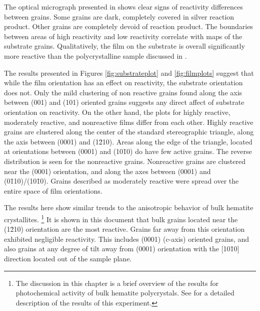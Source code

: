 The optical micrograph presented in  shows clear signs of reactivity differences between grains. Some grains are dark, completely covered in silver reaction product. Other grains are completely devoid of reaction product. The boundaries between areas of high reactivity and low reactivity correlate with  maps of the substrate grains. Qualitatively, the  film on the  substrate is overall significantly more reactive than the polycrystalline sample discussed in . 

The results presented in Figures \ref{fig:substrateplot} and \ref{fig:filmplots} suggest that while the film orientation has an effect on reactivity, the substrate orientation does not. Only the mild clustering of non reactive grains found along the axis between (001) and (101) oriented grains suggests any direct affect of substrate orientation on reactivity. On the other hand, the plots for highly reactive, moderately reactive, and nonreactive films differ from each other. Highly reactive grains are clustered along the center of the standard stereographic triangle, along the axis between (0001) and (1\={2}10). Areas along the edge of the triangle, located at orientations between (0001) and (10\={1}0) do have few active grains. The reverse distribution is seen for the nonreactive grains. Nonreactive grains are clustered near the (0001) orientation, and along the axes between (0001) and (0\={1}10)/(10\={1}0). Grains described as moderately reactive were spread over the entire space of film orientations. 

The results here show similar trends to the anisotropic behavior of bulk hematite crystallites.%
\footnote{%
	The discussion in this chapter is a brief overview of the results for photochemical activity of bulk hematite polycrystals. See  for a detailed description of the results of this experiment.
} 
It is shown in this document that bulk  grains located near the (1\={2}10) orientation are the most reactive. Grains far away from this orientation exhibited negligible reactivity. This includes (0001) (c-axis) oriented grains, and also grains at any degree of tilt away from (0001) orientation with the [10\={1}0] direction located out of the sample plane. 

